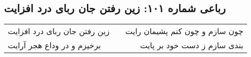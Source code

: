 \begin{center}
\section*{رباعی شماره ۱۰۱: زین رفتن جان ربای درد افزایت}
\label{sec:sh101}
\begin{longtable}{l p{0.5cm} r}
زین رفتن جان ربای درد افزایت
&&
چون سازم و چون کنم پشیمان رایت
\\
برخیزم و در وداع هجر آرایت
&&
بندی سازم ز دست خود بر پایت
\\
\end{longtable}
\end{center}
